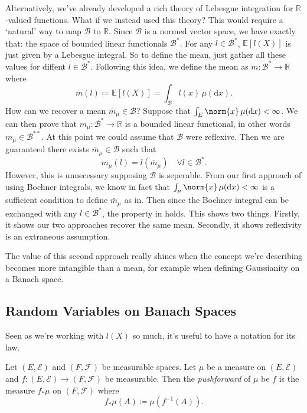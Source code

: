 \documentclass[fontsize=12pt, DIV=10]{scrreprt}
\theoremstyle{remark}
\newcommand{\defeq}{\coloneqq}
\newcommand{\R}{\mathbb R}
\newcommand{\E}{\mathbb E}
\newcommand{\calB}{\mathcal B}
\newcommand{\calE}{\mathcal E}
\newcommand{\calF}{\mathcal F}
\newcommand{\dif}[1]{\text{d} #1}
\begin{document}
Alternatively, we've already developed a rich theory of Lebesgue integration for $\R$-valued functions. What if we instead used this theory? This would require a `natural' way to map $\calB$ to $\R$. Since $\calB$ is a normed vector space, we have exactly that: the space of bounded linear functionals $\calB^*$. For any $l \in \calB^*$, $\E[l(X)]$ is just given by a Lebesgue integral. So to define the mean, just gather all these values for diffent $l \in \calB^*$. Following this idea, we define the mean as $m: \calB^* \to \R$ where
\begin{equation}
	m(l) \defeq \E[l(X)] = \int_{\calB} l(x) \, \mu(\dif x).
\end{equation}
How can we recover a mean $\bar{m}_{\mu} \in \calB$? Suppose that $\int_E \norm{x} \, \mu(\dif x) < \infty$. We can then prove that $m_{\mu}: \calB^* \to \R$ is a bounded linear functional, in other words $m_{\mu} \in \calB^{**}$. At this point we could assume that $\calB$ were reflexive. Then we are guaranteed there exists $\bar{m}_{\mu} \in \calB$ such that
\begin{equation}
	m_{\mu}(l) = l(\bar{m}_{\mu}) \quad \forall l \in \calB^*.
\end{equation}
However, this is unnecessary supposing $\calB$ is seperable. From our first approach of using Bochner integrals, we know in fact that $\int_{\mu} \norm{x} \, \mu(\dif x) < \infty$ is a sufficient condition to define $\bar{m}_{\mu}$ as in. Then since the Bochner integral can be exchanged with any $l \in \calB^*$, the property in holds. This shows two things. Firstly, it shows our two approaches recover the same mean. Secondly, it shows reflexivity is an extraneous assumption.

The value of this second approach really shines when the concept we're describing becomes more intangible than a mean, for example when defining Gaussianity on a Banach space.

\subsection{Random Variables on Banach Spaces}


Seen as we're working with $l(X)$ so much, it's useful to have a notation for its law.
\begin{defn}
	Let $(E, \calE)$ and $(F, \calF)$ be measurable spaces. Let $\mu$ be a measure on $(E, \calE)$ and $f: (E, \calE) \to (F, \calF)$ be measurable. Then the \emph{pushforward} of $\mu$ be $f$ is the measure $f_* \mu$ on $(F, \calF)$ where
	\begin{equation}
		f_* \mu(A) \defeq \mu(f^{-1}(A)).
	\end{equation}
\end{defn}
\end{document}
